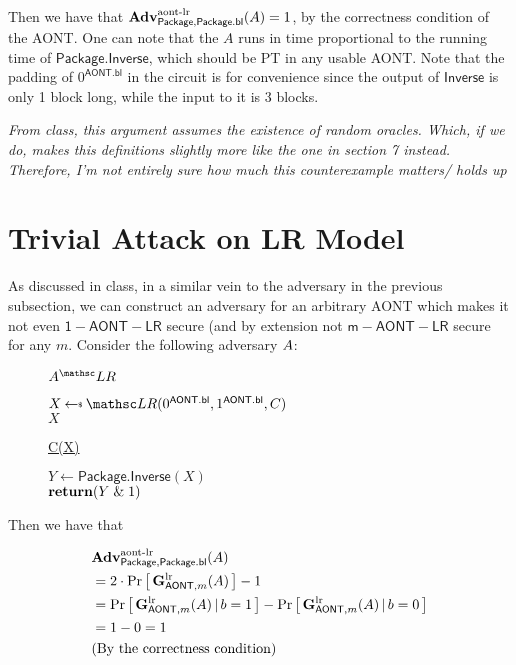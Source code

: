 \documentclass[11pt,twoside]{article}
\begin{document}
Then we have that $\textbf{Adv}^\text{aont-lr}_{\mathsf{Package},\mathsf{Package.bl}}(A)=1$, by the correctness condition of the AONT. One can note that the $A$ runs in time proportional to the running time of $\mathsf{Package.Inverse}$, which should be PT in any usable AONT. Note that the padding of $0^\mathsf{AONT.bl}$ in the circuit is for convenience since the output of $\mathsf{Inverse}$ is only 1 block long, while the input to it is 3 blocks. 

\emph{From class, this argument assumes the existence of random oracles. Which, if we do, makes this definitions slightly more like the one in section 7 instead. Therefore, I'm not entirely sure how much this counterexample matters/ holds up}

\section{Trivial Attack on LR Model} 

As discussed in class, in a similar vein to the adversary in the previous subsection, we can construct an adversary for an arbitrary AONT which makes it not even $\mathsf{1-AONT-LR}$ secure (and by extension not $\mathsf{m-AONT-LR}$ secure for any $m$. Consider the following adversary $A$:

\begin{figure}[H]
{
\underline{$\advA^\LRO$}

\begin{algorithm}[H]
$X \getsr \LRO(0^\mathsf{AONT.bl},1^\mathsf{AONT.bl},C)$\\
\Return $X$
\end{algorithm}

\underline{C(X)}

\begin{algorithm}[H]
$Y\gets\mathsf{Package.Inverse}(X)$\\
$\Return (Y\mathrel{\&} 1)$\\
\end{algorithm}
}
\end{figure}

Then we have that 

\begin{align*}
&\textbf{Adv}^\text{aont-lr}_{\mathsf{Package},\mathsf{Package.bl}}(A)\\
&=2\cdot{\Pr\left[\,{\mathbf{G}_{\mathsf{AONT},m}^\text{lr}(A)}\,\right]} - 1\\
&={\Pr}\left[\,\mathbf{G}_{\mathsf{AONT},m}^\text{lr}(A)\,|\,b=1\,\right] - {\Pr}\left[\,\mathbf{G}_{\mathsf{AONT},m}^\text{lr}(A)\,|\,b=0\,\right]\\
&=1 - 0 = 1\\
&\text{(By the correctness condition)}\\
\end{align*}
\end{document}

